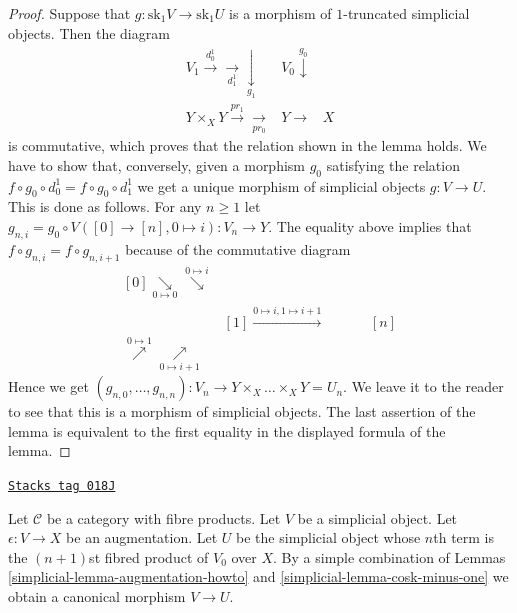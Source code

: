 \begin{proof}
Suppose that $g : \text{sk}_1V \to \text{sk}_1U$ is a morphism of
$1$-truncated simplicial objects. Then the diagram
$$
\begin{array}{ccc}V_1 \overset{d^1_0}{\longrightarrow}\underset{d^1_1}{\longrightarrow}\underset{g_1}{\downarrow} & V_0 \overset{g_0}{\downarrow} &  \\ Y \times_X Y \overset{pr_1}{\longrightarrow}\underset{pr_0}{\longrightarrow} & Y \longrightarrow & X\end{array}
$$
is commutative, which proves that the relation shown in
the lemma holds. We have to show that,
conversely, given a morphism $g_0$ satisfying the relation
$f \circ g_0 \circ d^1_0 = f \circ g_0 \circ d^1_1$
we get a unique morphism of simplicial objects $g : V \to U$.
This is done as follows. For any $n \geq 1$ let
$g_{n, i} = g_0 \circ V([0] \to [n], 0 \mapsto i) :
V_n \to Y$. The equality above implies that
$f \circ g_{n, i} = f \circ g_{n, i + 1}$ because of
the commutative diagram
$$
\begin{array}{cccccc}[0] \underset{0 \mapsto 0}{\searrow}\overset{0 \mapsto i}{\searrow} &  &  &  &  &  \\  & [1] \overset{0 \mapsto i, 1\mapsto i + 1}{\longrightarrow} &  &  &  & [n] \\ [0] \overset{0 \mapsto 1}{\nearrow}\underset{0 \mapsto i + 1}{\nearrow} &  &  &  &  & \end{array}
$$
Hence we get
$(g_{n, 0}, \ldots, g_{n, n}) : V_n \to Y \times_X\ldots \times_X Y = U_n$.
We leave it to the reader to see that this is a morphism of simplicial
objects. The last assertion of the lemma is equivalent to the
first equality in the displayed formula of the lemma.
\end{proof}

\begin{remark}[Augmentation]
\label{simplicial-remark-augmentation}
\href{https://stacks.math.columbia.edu/tag/018J}{\texttt{Stacks tag 018J}}

Let $\mathcal{C}$ be a category with fibre products.
Let $V$ be a simplicial object.
Let $\epsilon : V \to X$ be an augmentation.
Let $U$ be the simplicial object whose $n$th term
is the $(n + 1)$st fibred product of $V_0$ over $X$.
By a simple combination of
Lemmas \ref{simplicial-lemma-augmentation-howto} and \ref{simplicial-lemma-cosk-minus-one}
we  obtain a canonical morphism
$V \to U$.
\end{remark}

